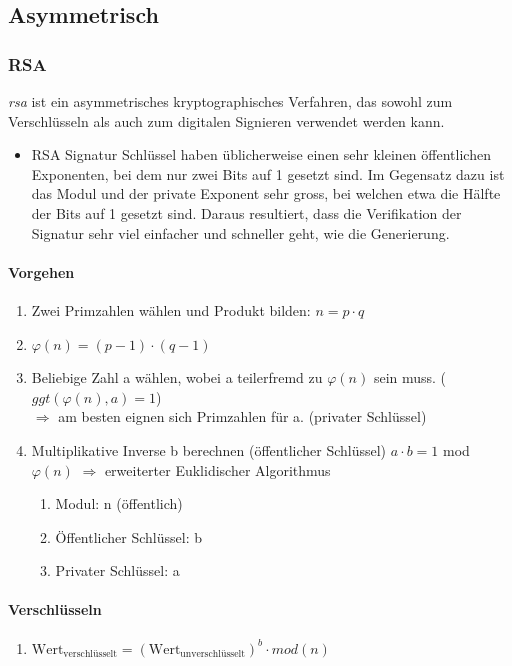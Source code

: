 \subsection{Asymmetrisch}
\subsubsection{RSA}
\textit{rsa} ist ein asymmetrisches kryptographisches Verfahren, das sowohl zum Verschlüsseln als auch zum digitalen Signieren verwendet werden kann.
\begin{itemize}
	\item RSA Signatur Schlüssel haben üblicherweise einen sehr kleinen öffentlichen Exponenten, bei dem nur zwei Bits auf 1 gesetzt sind. Im Gegensatz dazu ist das Modul und der private Exponent sehr gross, bei welchen etwa die Hälfte der Bits auf 1 gesetzt sind. Daraus resultiert, dass die Verifikation der Signatur sehr viel einfacher und schneller geht, wie die Generierung.
\end{itemize}

\paragraph{Vorgehen}
\begin{enumerate}
	\item Zwei Primzahlen wählen und Produkt bilden: $n = p \cdot q$
	\item $\varphi(n) = (p - 1) \cdot (q - 1)$
	\item Beliebige Zahl a wählen, wobei a teilerfremd zu $\varphi(n)$ sein muss. ($ggt(\varphi(n), a) = 1$) \\ $\Rightarrow$ am besten eignen sich Primzahlen für a. (privater Schlüssel)
	\item Multiplikative Inverse b berechnen (öffentlicher Schlüssel) $a \cdot b = 1$ mod $\varphi(n)$ $\Rightarrow$ erweiterter Euklidischer Algorithmus
	\begin{enumerate}
		\item Modul: n (öffentlich)
		\item Öffentlicher Schlüssel: b
		\item Privater Schlüssel: a
	\end{enumerate}	
\end{enumerate}

\paragraph{Verschlüsseln}
\begin{enumerate}
	\item $\text{Wert}_\text{verschlüsselt} = (\text{Wert}_\text{unverschlüsselt})^{b} \cdot mod(n)$
\end{enumerate}

